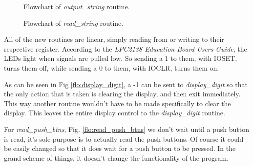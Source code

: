 \documentclass[letterpaper,10pt]{article}
\begin{document}
    \begin{figure}[p]
        
        \caption{Flowchart of \textit{output\_string} routine.}
        \label{flo:output_string}
    \end{figure}

    \begin{figure}[p]
        
        \caption{Flowchart of \textit{read\_string} routine.}
        \label{flo:read_string}
    \end{figure}

    \clearpage

    All of the new routines are linear, simply reading from or writing to
    their respective register. According to the \textit{LPC2138 Education Board
    Users Guide}, the LEDs light when signals are pulled low. So sending a 1
    to them, with IOSET, turns them off, while sending a 0 to them, with IOCLR,
    turns them on.

   
   \label{flo:display_digit}

    As can be seen in Fig \ref{flo:display_digit}, a -1 can be sent to
    \textit{display\_digit} so that the only action that is taken is clearing
    the display, and then exit immediately. This way another routine wouldn't
    have to be made specifically to clear the display. This leaves the entire
    display control to the \textit{display\_digit} routine.

   
   \label{flo:read_push_btns}

    For \textit{read\_push\_btns}, Fig. \ref{flo:read_push_btns} we don't wait
    until a push button is read, it's sole purpose is to actually read the push
    buttons. Of course it could be easily changed so that it does wait for a
    push button to be pressed. In the grand scheme of things, it doesn't change
    the functionality of the program.

    \begin{minipage}{0.5\linewidth}
        
        \label{flo:leds}
    \end{minipage}%
    \begin{minipage}{0.5\linewidth}
        
        \label{flo:rgb_led}
    \end{minipage}
\end{document}
